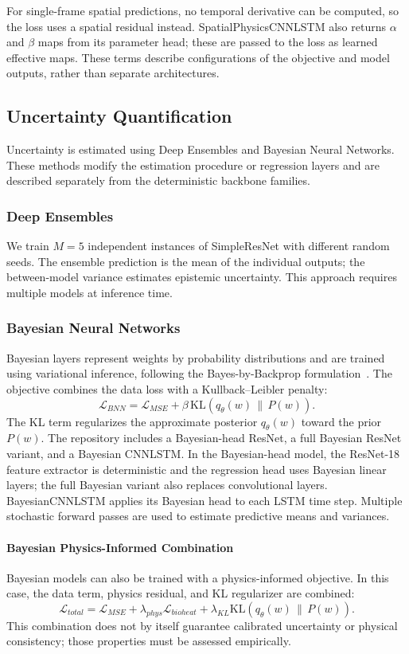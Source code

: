For single-frame spatial predictions, no temporal derivative can be
computed, so the loss uses a spatial residual instead. SpatialPhysicsCNNLSTM
also returns $\alpha$ and $\beta$ maps from its parameter head; these are
passed to the loss as learned effective maps. These terms describe
configurations of the objective and model outputs, rather than separate
architectures.

\subsection{Uncertainty Quantification}
Uncertainty is estimated using Deep Ensembles and Bayesian Neural Networks.
These methods modify the estimation procedure or regression layers and are
described separately from the deterministic backbone families.

\subsubsection{Deep Ensembles}
We train $M=5$ independent instances of SimpleResNet with different random
seeds. The ensemble prediction is the mean of the individual outputs; the
between-model variance estimates epistemic uncertainty. This approach
requires multiple models at inference time.

\subsubsection{Bayesian Neural Networks}
Bayesian layers represent weights by probability distributions and are
trained using variational inference, following the Bayes-by-Backprop
formulation~\cite{blundell2015weight}. The objective combines the data loss
with a Kullback--Leibler penalty:
\begin{equation}
    \mathcal{L}_{BNN} =
    \mathcal{L}_{MSE}
    + \beta\,\mathrm{KL}\!\left(q_\theta(w)\,\|\,P(w)\right).
\end{equation}
The KL term regularizes the approximate posterior $q_\theta(w)$ toward the
prior $P(w)$. The repository includes a Bayesian-head ResNet, a full Bayesian
ResNet variant, and a Bayesian CNNLSTM. In the Bayesian-head model, the
ResNet-18 feature extractor is deterministic and the regression head uses
Bayesian linear layers; the full Bayesian variant also replaces convolutional
layers. BayesianCNNLSTM applies its Bayesian head to each LSTM time step.
Multiple stochastic forward passes are used to estimate predictive means and
variances.

\paragraph{Bayesian Physics-Informed Combination}
Bayesian models can also be trained with a physics-informed objective. In
this case, the data term, physics residual, and KL regularizer are combined:
\begin{equation}
    \mathcal{L}_{total} =
    \mathcal{L}_{MSE}
    + \lambda_{phys}\mathcal{L}_{bioheat}
    + \lambda_{KL}\mathrm{KL}\!\left(q_\theta(w)\,\|\,P(w)\right).
\end{equation}
This combination does not by itself guarantee calibrated uncertainty or
physical consistency; those properties must be assessed empirically.
